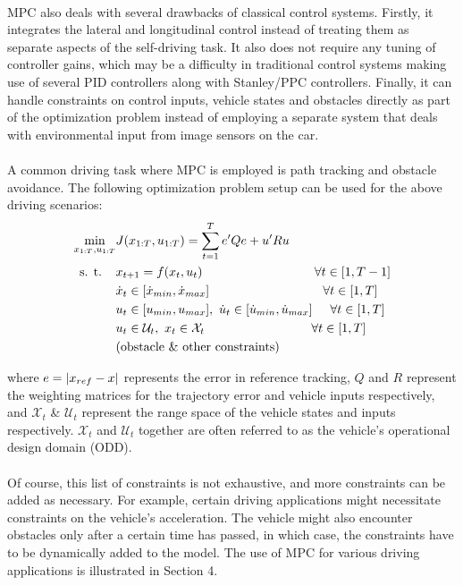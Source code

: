 \paragraph{}
MPC also deals with several drawbacks of classical control systems. Firstly, it integrates the lateral and longitudinal control instead of treating them as separate aspects of the self-driving task. It also does not require any tuning of controller gains, which may be a difficulty in traditional control systems making use of several PID controllers along with Stanley/PPC controllers. Finally, it can handle constraints on control inputs, vehicle states and obstacles directly as part of the optimization problem instead of employing a separate system that deals with environmental input from image sensors on the car.

\paragraph{}
A common driving task where MPC is employed is path tracking and obstacle avoidance. The following optimization problem setup can be used for the above driving scenarios:
\begin{align*}
    \min_{x_{1:T}, u_{1:T}} & J(x_{1:T}, u_{1:T}) = \sum_{t=1}^T e^{\prime}Qe + u^{\prime}Ru\\
    \text{s. t. }\text{ }\text{ } & x_{t+1} = f(x_t, u_t)\hspace{31.5mm}\forall t\in[1, T-1]\\
    & \dot{x}_t\in[\dot{x}_{min}, \dot{x}_{max}]\hspace{32mm}\forall t\in[1, T]\\
    & u_t\in[u_{min}, u_{max}],\text{ }\dot{u}_t\in[\dot{u}_{min}, \dot{u}_{max}]\hspace{5mm}\forall t\in[1, T]\\
    & u_t\in\mathcal{U}_t,\text{ }x_t\in\mathcal{X}_t\hspace{30mm}\forall t\in[1, T]\\
    & \text{(obstacle \& other constraints)}
\end{align*}

\noindent where $e=\abs{x_{ref}-x}$ represents the error in reference tracking, $Q$ and $R$ represent the weighting matrices for the trajectory error and vehicle inputs respectively, and $\mathcal{X}_t$ \& $\mathcal{U}_t$ represent the range space of the vehicle states and inputs respectively. $\mathcal{X}_t$ and $\mathcal{U}_t$ together are often referred to as the vehicle's operational design domain (ODD).

\paragraph{}
Of course, this list of constraints is not exhaustive, and more constraints can be added as necessary. For example, certain driving applications might necessitate constraints on the vehicle's acceleration. The vehicle might also encounter obstacles only after a certain time has passed, in which case, the constraints have to be dynamically added to the model. The use of MPC for various driving applications is illustrated in Section 4.
